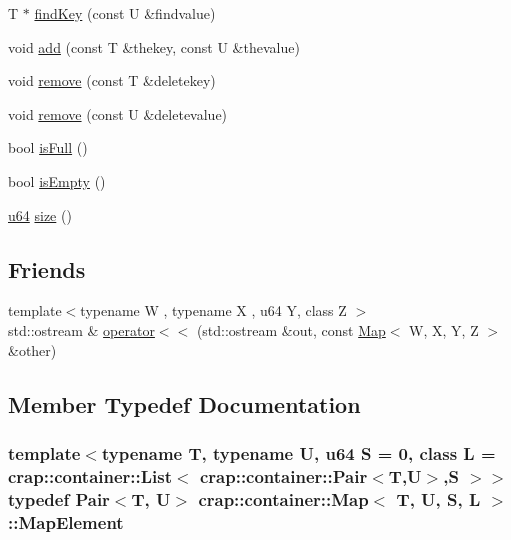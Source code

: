 \begin{DoxyCompactItemize}
\item 
T $\ast$ \hyperlink{classcrap_1_1container_1_1_map_a01688dc842e02174c2a80cfa771e7fa2}{find\-Key} (const U \&findvalue)
\item 
void \hyperlink{classcrap_1_1container_1_1_map_a5d89f55e1783f994d2d4da75f4f49f01}{add} (const T \&thekey, const U \&thevalue)
\item 
void \hyperlink{classcrap_1_1container_1_1_map_a89d2a56707c2a9dba368bf78ae8f05e0}{remove} (const T \&deletekey)
\item 
void \hyperlink{classcrap_1_1container_1_1_map_aedf1f6e873cfc1d27aab283ba82d6381}{remove} (const U \&deletevalue)
\item 
bool \hyperlink{classcrap_1_1container_1_1_map_aa3c393314145f117b7e1896eb2087675}{is\-Full} ()
\item 
bool \hyperlink{classcrap_1_1container_1_1_map_adc0c60f190eb25018e145e5f3ae30615}{is\-Empty} ()
\item 
\hyperlink{types_8h_a3f7e2bcbb0b4c338f3c4f6c937cd4234}{u64} \hyperlink{classcrap_1_1container_1_1_map_a6194f89da172bea47b527b7bba99b644}{size} ()
\end{DoxyCompactItemize}
\subsection*{Friends}
\begin{DoxyCompactItemize}
\item 
{\footnotesize template$<$typename W , typename X , u64 Y, class Z $>$ }\\std\-::ostream \& \hyperlink{classcrap_1_1container_1_1_map_aa2fe47d887b91480107cc4eb638dcb2e}{operator$<$$<$} (std\-::ostream \&out, const \hyperlink{classcrap_1_1container_1_1_map}{Map}$<$ W, X, Y, Z $>$ \&other)
\end{DoxyCompactItemize}


\subsection{Member Typedef Documentation}
\hypertarget{classcrap_1_1container_1_1_map_a87121369de54f6650c8a84a0a19fab32}{
\subsubsection[{Map\-Element}]{\setlength{\rightskip}{0pt plus 5cm}template$<$typename T, typename U, u64 S = 0, class L = crap\-::container\-::\-List$<$ crap\-::container\-::\-Pair$<$\-T,\-U$>$,\-S $>$$>$ typedef {\bf Pair}$<$T, U$>$ {\bf crap\-::container\-::\-Map}$<$ T, U, S, L $>$\-::{\bf Map\-Element}}}\label{classcrap_1_1container_1_1_map_a87121369de54f6650c8a84a0a19fab32}


